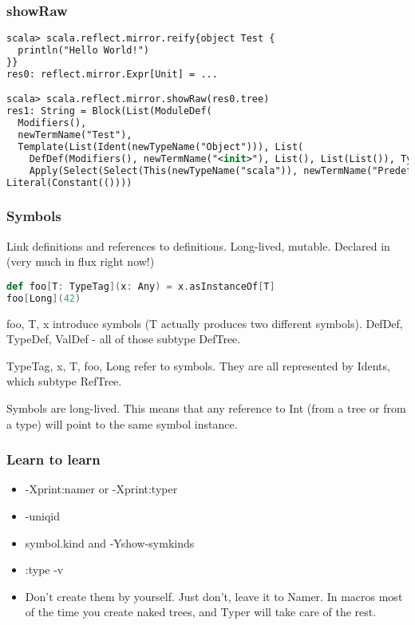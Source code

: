 \documentclass[hyperref={bookmarks=false}]{beamer}
\begin{document}
\begin{frame}[fragile]
\frametitle{showRaw}

\begin{lstlisting}[language=XML]
scala> scala.reflect.mirror.reify{object Test {
  println("Hello World!")
}}
res0: reflect.mirror.Expr[Unit] = ...

scala> scala.reflect.mirror.showRaw(res0.tree)
res1: String = Block(List(ModuleDef(
  Modifiers(),
  newTermName("Test"),
  Template(List(Ident(newTypeName("Object"))), List(
    DefDef(Modifiers(), newTermName("<init>"), List(), List(List()), TypeTree(), Block(List(Apply(Select(Super(This(newTypeName("")), newTypeName("")), newTermName("<init>")), List())), Literal(Constant(())))),
    Apply(Select(Select(This(newTypeName("scala")), newTermName("Predef")), newTermName("println")), List(Literal(Constant("Hello World!")))))))),
Literal(Constant(())))
\end{lstlisting}

\end{frame}

\begin{frame}[fragile]
\frametitle{Symbols}

Link definitions and references to definitions.
Long-lived, mutable.
Declared in  (very much in flux right now!)

\begin{lstlisting}[language=Scala]
def foo[T: TypeTag](x: Any) = x.asInstanceOf[T]
foo[Long](42)
\end{lstlisting}

foo, T, x introduce symbols (T actually produces two different symbols).
DefDef, TypeDef, ValDef - all of those subtype DefTree.

TypeTag, x, T, foo, Long refer to symbols.
They are all represented by Idents, which subtype RefTree.

Symbols are long-lived. This means that any
reference to Int (from a tree or from a type) will point to the
same symbol instance.

\end{frame}

\begin{frame}[fragile]
\frametitle{Learn to learn}

\begin{itemize}
\item -Xprint:namer or -Xprint:typer
\item -uniqid
\item symbol.kind and -Yshow-symkinds
\item :type -v
\item Don't create them by yourself. Just don't, leave it to Namer. In macros most of the time you create naked trees, and Typer will take care of the rest.
\end{itemize}

\end{frame}
\end{document}

